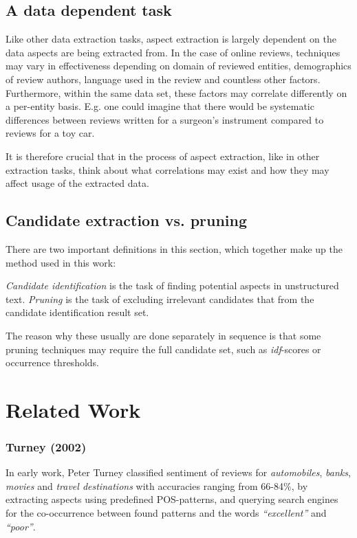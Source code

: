 \documentclass[a4paper,11pt]{kth-mag}
\begin{document}
\subsection{A data dependent task}
Like other data extraction tasks, aspect extraction is largely dependent on the data aspects are being extracted from.
In the case of online reviews, techniques may vary in effectiveness depending on domain of reviewed entities, demographics of review authors, language used in the review and countless other factors. Furthermore, within the same data set, these factors may correlate differently on a per-entity basis. E.g. one could imagine that there would be systematic differences between reviews written for a surgeon's instrument compared to reviews for a toy car.

It is therefore crucial that in the process of aspect extraction, like in other extraction tasks, think about what correlations may exist and how they may affect usage of the extracted data.

\subsection{Candidate extraction vs. pruning}
There are two important definitions in this section, which together make up the method used in this work:

\emph{Candidate identification} is the task of finding potential aspects in unstructured text. \emph{Pruning} is the task of excluding irrelevant candidates that from the candidate identification result set.

The reason why these usually are done separately in sequence is that some pruning techniques may require the full candidate set, such as \emph{idf}-scores or occurrence thresholds.


\section{Related Work}

\subsubsection{Turney (2002)}
In early work, Peter Turney classified sentiment of reviews for \emph{automobiles}, \emph{banks}, \emph{movies} and \emph{travel destinations} with accuracies ranging from 66-84\%, by extracting aspects using predefined POS-patterns, and querying search engines for the co-occurrence between found patterns and the words \emph{``excellent''} and \emph{``poor''}.
\end{document}
